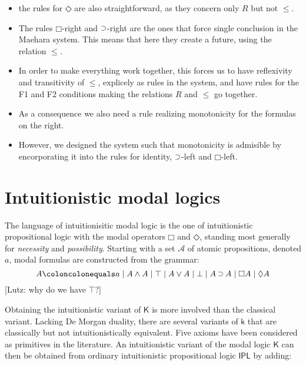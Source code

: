 \documentclass[a4paper]{article}
\theoremstyle{plain}
\theoremstyle{definition}
\newcommand{\lutz}[1]{{\color{notgreen}[Lutz: #1]}}
\newcommand*{\K}{\mathsf{K}}
\newcommand*{\AND}{\mathbin{\wedge}}
\newcommand*{\TOP}{\mathord{\top}}
\newcommand*{\OR}{\mathbin{\vee}}
\newcommand*{\BOT}{\mathord{\bot}}
\newcommand*{\IMP}{\mathbin{\scalebox{.9}{\raise.2ex\hbox{$\supset$}}}}
\newcommand*{\BOX}{\mathord{\Box}}
\newcommand*{\DIA}{\mathord{\Diamond}}
\newcommand*{\rn}[1]  {\ensuremath{\mathsf{#1}}}
\begin{document}
{\begin{itemize}
\begin{itemize}
      identity, but there is a subtlety; see below...
    \item the rules for $\DIA$ are also straightforward, as they
      concern only $R$ but not $\le$.
    \item The rules $\BOX$-right and $\IMP$-right are the ones that
      force single conclusion in the Maehara system. This means that
      here they create a future, using the relation $\le$.
    \item In order to make everything work together, this forces us to
      have reflexivity and transitivity of $\le$, explicely as rules
      in the system, and have rules for the F1 and F2 conditions
      making the relations $R$ and $\le$ go together.
    \item As a consequence we also need a rule realizing monotonicity
      for the formulas on the right.
    \item However, we designed the system such that monotonicity is
      admisible by encorporating it into the rules for identity,
      $\IMP$-left and $\BOX$-left.
    \end{itemize}
  \end{itemize}
}
%

%
%
\section{Intuitionistic modal logics}\label{sec:intmod}
The language of {intuitionisitic modal logic} is the one of intuitionistic propositional logic with the modal operators $\BOX$ and $\DIA$, standing most generally for \emph{necessity} and \emph{possibility}.
%
Starting with a set $\mathcal{A}$ of atomic propositions, denoted $a$, modal formulas are constructed from the grammar:
%
$$
A \coloncolonequals
a \mid A \AND A \mid \TOP \mid A \OR A \mid \BOT \mid A \IMP A \mid \BOX A \mid \DIA A
$$
%
\lutz{why do we have $\TOP$?}

Obtaining the intuitionistic variant of $\mathsf{K}$ is more involved than the classical variant. 
Lacking De Morgan duality, there are several variants of $\mathsf{k}$ that are classically but not intuitionistically equivalent. Five axioms have been considered as primitives in the literature. An intuitionistic variant of the modal logic $\K$ can then be obtained from ordinary intuitionistic propositional logic $\rn{IPL}$ by adding:
%
\end{document}
